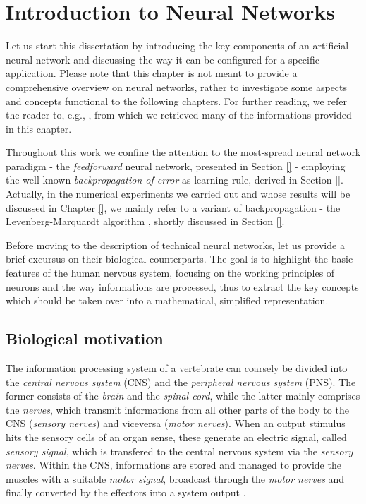 \documentclass[11pt, a4paper]{report}
\theoremstyle{theorem}
\numberwithin{equation}{section}
\numberwithin{figure}{section}
\begin{document}
	\chapter{Introduction to Neural Networks}
	\label{chapter:Introduction to Neural Networks}
	
		Let us start this dissertation by introducing the key components of an artificial neural network and discussing the way it can be configured for a specific application. Please note that this chapter is not meant to provide a comprehensive overview on neural networks, rather to investigate some aspects and concepts functional to the following chapters. For further reading, we refer the reader to, e.g., \cite{Hag14, Hay05, Kri}, from which we retrieved many of the informations provided in this chapter.
		
		Throughout this work we confine the attention to the most-spread neural network paradigm - the \emph{feedforward} neural network, presented in Section \ref{} - employing the well-known \emph{backpropagation of error} as learning rule, derived in Section \ref{}. Actually, in the numerical experiments we carried out and whose results will be discussed in Chapter \ref{}, we mainly refer to a variant of backpropagation - the Levenberg-Marquardt algorithm \cite{}, shortly discussed in Section \ref{}. 
		
		Before moving to the description of technical neural networks, let us provide a brief excursus on their biological counterparts. The goal is to highlight the basic features of the human nervous system, focusing on the working principles of neurons and the way informations are processed, thus to extract the key concepts which should be taken over into a mathematical, simplified representation. 
		
	\section{Biological motivation}
	\label{section:Biological motivation} 
		
		The information processing system of a vertebrate can coarsely be divided into the \emph{central nervous system} (CNS) and the \emph{peripheral nervous system} (PNS). The former consists of the \emph{brain} and the \emph{spinal cord}, while the latter mainly comprises the \emph{nerves}, which transmit informations from all other parts of the body to the CNS (\emph{sensory nerves}) and viceversa (\emph{motor nerves}). When an output stimulus hits the sensory cells of an organ sense, these generate an electric signal, called \emph{sensory signal}, which is transfered to the central nervous system via the \emph{sensory nerves}. Within the CNS, informations are stored and managed to provide the muscles with a suitable \emph{motor signal}, broadcast through the \emph{motor nerves} and finally converted by the effectors into a system output \cite{Hay05}. %
		
\end{document}
